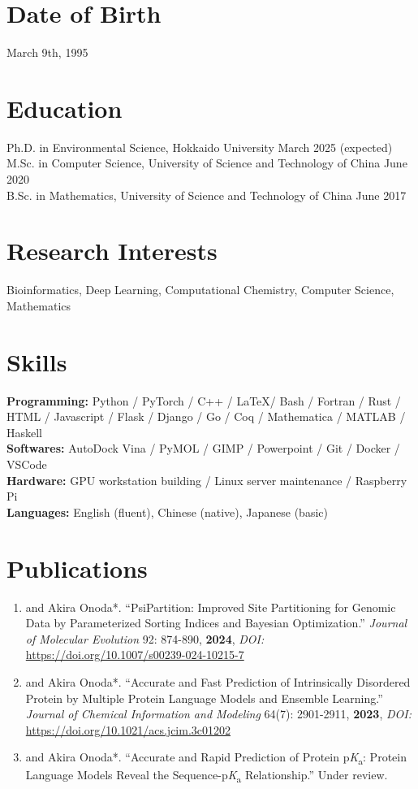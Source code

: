 \documentclass[a4paper,11pt]{article}
\newcommand{\pKa}{p\textit{K}\textsubscript{a}}
\begin{document}
\vspace{0.5cm}

\section*{Date of Birth}
March 9th, 1995
\section*{Education}
Ph.D. in Environmental Science, Hokkaido University \hfill March 2025 (expected)\\
M.Sc. in Computer Science, University of Science and Technology of China \hfill June 2020\\
B.Sc. in Mathematics, University of Science and Technology of China \hfill June 2017
\section*{Research Interests}
Bioinformatics, Deep Learning, Computational Chemistry, Computer Science, Mathematics
\section*{Skills}
\textbf{Programming:} Python / PyTorch / C++ / \LaTeX / Bash / Fortran / Rust / HTML / Javascript / Flask / Django / Go / Coq / Mathematica / MATLAB / Haskell\\
\textbf{Softwares:} AutoDock Vina / PyMOL / GIMP / Powerpoint / Git / Docker / VSCode\\
\textbf{Hardware:} GPU workstation building / Linux server maintenance / Raspberry Pi\\
\textbf{Languages:} English (fluent), Chinese (native), Japanese (basic)

\section*{Publications}
\begin{enumerate}
    \item {} and Akira Onoda*. ``PsiPartition: Improved Site Partitioning for Genomic Data by Parameterized Sorting Indices and Bayesian Optimization.'' \textit{Journal of Molecular Evolution} 92: 874-890, \textbf{2024}, \emph{DOI:} \url{https://doi.org/10.1007/s00239-024-10215-7}
    \item {} and Akira Onoda*. ``Accurate and Fast Prediction of Intrinsically Disordered Protein by Multiple Protein Language Models and Ensemble Learning.'' \textit{Journal of Chemical Information and Modeling} 64(7): 2901-2911, \textbf{2023}, \emph{DOI:} \url{https://doi.org/10.1021/acs.jcim.3c01202} 
    \item {} and Akira Onoda*. ``Accurate and Rapid Prediction of Protein \pKa{}: Protein Language Models Reveal the Sequence-\pKa{} Relationship.'' Under review.
\end{enumerate}
\end{document}
